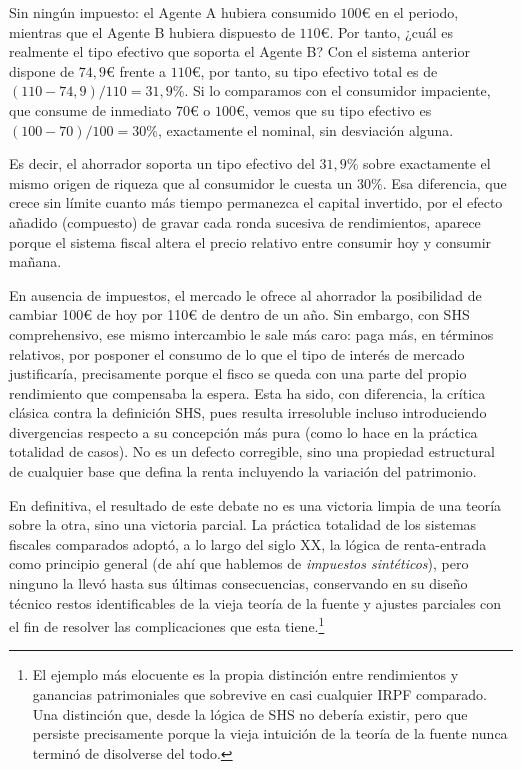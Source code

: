 \documentclass[10pt,a4paper]{article}
\begin{document}
Sin ningún impuesto: el Agente A hubiera consumido $100€$ en el periodo, mientras que el Agente B hubiera dispuesto de $110€$. Por tanto, ¿cuál es realmente el tipo efectivo que soporta el Agente B? Con el sistema anterior dispone de $74,9€$ frente a $110€$, por tanto, su tipo efectivo total es de $(110 − 74,9) / 110 = 31,9\%$. Si lo comparamos con el consumidor impaciente, que consume de inmediato $70€$ o $100€$, vemos que su tipo efectivo es $(100-70)/100=30\%$, exactamente el nominal, sin desviación alguna.

Es decir, el ahorrador soporta un tipo efectivo del $31,9\%$ sobre exactamente el mismo origen de riqueza que al consumidor le cuesta un $30\%$. Esa diferencia, que crece sin límite cuanto más tiempo permanezca el capital invertido, por el efecto añadido (compuesto) de gravar cada ronda sucesiva de rendimientos, aparece porque el sistema fiscal altera el precio relativo entre consumir hoy y consumir mañana. 

En ausencia de impuestos, el mercado le ofrece al ahorrador la posibilidad de cambiar 100€ de hoy por 110€ de dentro de un año. Sin embargo, con SHS comprehensivo, ese mismo intercambio le sale más caro: paga más, en términos relativos, por posponer el consumo de lo que el tipo de interés de mercado justificaría, precisamente porque el fisco se queda con una parte del propio rendimiento que compensaba la espera. Esta ha sido, con diferencia, la crítica clásica contra la definición SHS, pues resulta irresoluble incluso introduciendo divergencias respecto a su concepción más pura (como lo hace en la práctica totalidad de casos). No es un defecto corregible, sino una propiedad estructural de cualquier base que defina la renta incluyendo la variación del patrimonio. 

En definitiva, el resultado de este debate no es una victoria limpia de una teoría sobre la otra, sino una victoria parcial. La práctica totalidad de los sistemas fiscales comparados adoptó, a lo largo del siglo XX, la lógica de renta-entrada como principio general (de ahí que hablemos de \textit{impuestos sintéticos}), pero ninguno la llevó hasta sus últimas consecuencias, conservando en su diseño técnico restos identificables de la vieja teoría de la fuente y ajustes parciales con el fin de resolver las complicaciones que esta tiene.\footnote{%
    El ejemplo más elocuente es la propia distinción entre rendimientos y ganancias patrimoniales que sobrevive en casi cualquier IRPF comparado. Una distinción que, desde la lógica de SHS no debería existir, pero que persiste precisamente porque la vieja intuición de la teoría de la fuente nunca terminó de disolverse del todo.
}
\end{document}
